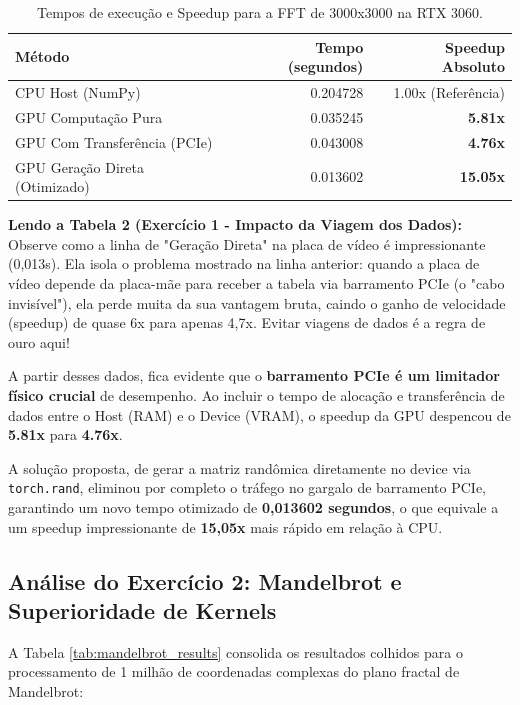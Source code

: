 \documentclass[12pt,a4paper]{article}
\begin{document}
\begin{table}[H]
\centering
\caption{Tempos de execução e Speedup para a FFT de 3000x3000 na RTX 3060.}
\label{tab:fft_results}
\begin{tabular}{@{}lrr@{}}
\toprule
\textbf{Método} & \textbf{Tempo (segundos)} & \textbf{Speedup Absoluto} \\ \midrule
CPU Host (NumPy) & 0.204728 & 1.00x (Referência) \\
GPU Computação Pura & 0.035245 & \textbf{5.81x} \\
GPU Com Transferência (PCIe) & 0.043008 & \textbf{4.76x} \\
GPU Geração Direta (Otimizado) & 0.013602 & \textbf{15.05x} \\ \bottomrule
\end{tabular}
\end{table}

\textbf{Lendo a Tabela 2 (Exercício 1 - Impacto da Viagem dos Dados):} Observe como a linha de "Geração Direta" na placa de vídeo é impressionante (0,013s). Ela isola o problema mostrado na linha anterior: quando a placa de vídeo depende da placa-mãe para receber a tabela via barramento PCIe (o "cabo invisível"), ela perde muita da sua vantagem bruta, caindo o ganho de velocidade (speedup) de quase 6x para apenas 4,7x. Evitar viagens de dados é a regra de ouro aqui!

A partir desses dados, fica evidente que o \textbf{barramento PCIe é um limitador físico crucial} de desempenho. Ao incluir o tempo de alocação e transferência de dados entre o Host (RAM) e o Device (VRAM), o speedup da GPU despencou de \textbf{5.81x} para \textbf{4.76x}. 

A solução proposta, de gerar a matriz randômica diretamente no device via \texttt{torch.rand}, eliminou por completo o tráfego no gargalo de barramento PCIe, garantindo um novo tempo otimizado de \textbf{0,013602 segundos}, o que equivale a um speedup impressionante de \textbf{15,05x} mais rápido em relação à CPU.

\subsection{Análise do Exercício 2: Mandelbrot e Superioridade de Kernels}
A Tabela \ref{tab:mandelbrot_results} consolida os resultados colhidos para o processamento de 1 milhão de coordenadas complexas do plano fractal de Mandelbrot:
\end{document}
